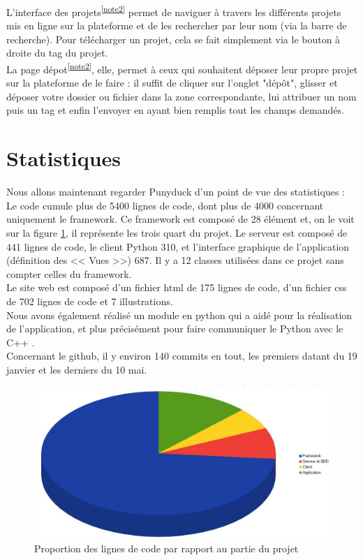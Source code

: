 \documentclass[twoside]{report}
\begin{document}
L'interface des projets\textsuperscript{\ref{note2}} permet de naviguer à travers les différents projets mis en ligne sur la plateforme et de les rechercher par leur nom (via la barre de recherche). Pour télécharger un projet, cela se fait simplement via le bouton à droite du tag du projet.\\
La page dépot\textsuperscript{\ref{note2}}, elle, permet à ceux qui souhaitent déposer leur propre projet sur la plateforme de le faire : il suffit de cliquer sur l'onglet "dépôt", glisser et déposer votre dossier ou fichier dans la zone correspondante, lui attribuer un nom puis un tag et enfin l'envoyer en ayant bien remplis tout les champs demandés.

\newpage
\section{Statistiques} %
Nous allons maintenant regarder Punyduck d’un point de vue des statistiques :\\
Le code cumule plus de 5400 lignes de code, dont plus de 4000 concernant uniquement le framework. Ce framework est composé de 28 élément et, on le voit sur la figure \ref{stats}, il représente les trois quart du projet. Le serveur est composé de 441 lignes de code, le client Python 310, et l'interface graphique de l'application (définition des << Vues >>) 687. Il y a 12 classes utilisées dans ce projet sans compter celles du framework.\\
Le site web est composé d’un fichier html de 175 lignes de code, d’un fichier css de 702 lignes de code et 7 illustrations. \\
Nous avons également réalisé un module en python qui a aidé pour la réalisation de l'application, et plus précisément pour faire communiquer le Python avec le C++ .\\
Concernant le github, il y environ 140 commits en tout, les premiers datant du 19 janvier et les derniers du 10 mai.
\vspace{2cm}
\begin{figure}[h]
    \centering
    \includegraphics[scale=0.6]{camenbertstatPNDK.JPG}
    \caption{Proportion des lignes de code par rapport au partie du projet}
    \label{stats}
\end{figure}
\end{document}
